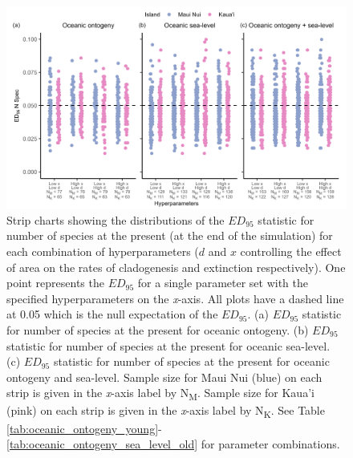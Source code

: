 \begin{figure}
    \centering
    \includegraphics[width=\textwidth]{JBI-21-0508_FigS9.png}
    \caption{Strip charts showing the distributions of the $ED_{95}$ statistic for number of species at the present (at the end of the simulation) for each combination of hyperparameters ($d$ and $x$ controlling the effect of area on the rates of cladogenesis and extinction respectively). One point represents the $ED_{95}$ for a single parameter set with the specified hyperparameters on the \textit{x}-axis. All plots have a dashed line at 0.05 which is the null expectation of the $ED_{95}$. (a) $ED_{95}$ statistic for number of species at the present for oceanic ontogeny. (b) $ED_{95}$ statistic for number of species at the present for oceanic sea-level. (c) $ED_{95}$ statistic for number of species at the present for oceanic ontogeny and sea-level. Sample size for Maui Nui (blue) on each strip is given in the \textit{x}-axis label by N\textsubscript{M}. Sample size for Kaua'i (pink) on each strip is given in the \textit{x}-axis label by N\textsubscript{K}. See Table \ref{tab:oceanic_ontogeny_young}-\ref{tab:oceanic_ontogeny_sea_level_old} for parameter combinations.}
    \label{fig:Hyperparameters_num_spec}
\end{figure}

